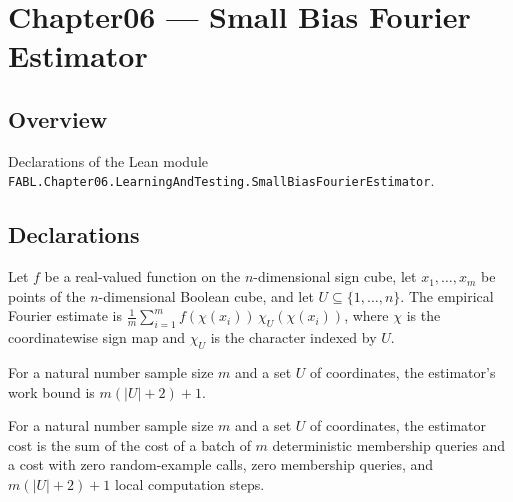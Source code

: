 \chapter{Chapter06 — Small Bias Fourier Estimator}
\section{Overview}

Declarations of the Lean module \texttt{FABL.Chapter06.LearningAndTesting.SmallBiasFourierEstimator}.

\section{Declarations}

\begin{definition}
\label{FABL.smallBiasFourierEstimate}
\leanok
{}
Let $f$ be a real-valued function on the $n$-dimensional sign cube, let $x_1,\ldots,x_m$
be points of the $n$-dimensional Boolean cube, and let $U\subseteq\{1,\ldots,n\}$. The
empirical Fourier estimate is $\frac{1}{m}\sum_{i=1}^m f(\chi(x_i))\,\chi_U(\chi(x_i))$,
where $\chi$ is the coordinatewise sign map and $\chi_U$ is the character indexed by
$U$.
\end{definition}

\begin{definition}
\label{FABL.smallBiasFourierEstimatorWork}
\leanok
For a natural number sample size $m$ and a set $U$ of coordinates, the estimator's work
bound is $m(|U|+2)+1$.
\end{definition}

\begin{definition}
\label{FABL.smallBiasFourierEstimatorCost}
\leanok
{}
For a natural number sample size $m$ and a set $U$ of coordinates, the estimator cost is
the sum of the cost of a batch of $m$ deterministic membership queries and a cost with
zero random-example calls, zero membership queries, and $m(|U|+2)+1$ local computation
steps.
\end{definition}

